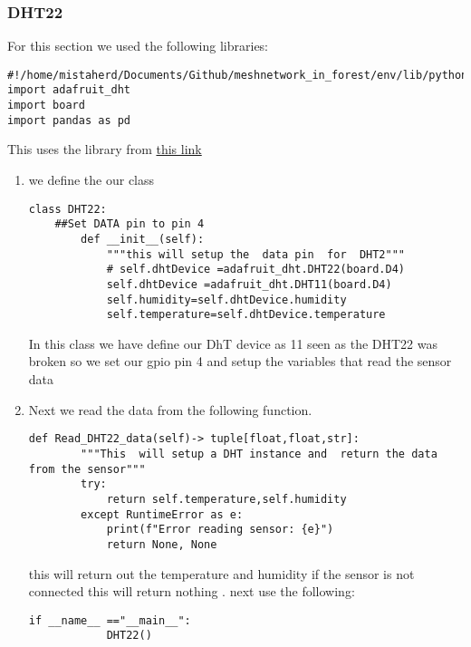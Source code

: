 \subsubsection{DHT22}
For this section we used the following libraries:
\begin{lstlisting}[style=mystyle]
#!/home/mistaherd/Documents/Github/meshnetwork_in_forest/env/lib/python3.11
import adafruit_dht 
import board
import pandas as pd  
\end{lstlisting} 
This uses the library from \href{https://github.com/mrmcwethy/Adafruit_CircuitPython_DHT}{this link}
\begin{enumerate}
    \item we define the our class
    \begin{lstlisting}[style=mystyle]
    class DHT22:
    ##Set DATA pin to pin 4
        def __init__(self):
            """this will setup the  data pin  for  DHT2"""
            # self.dhtDevice =adafruit_dht.DHT22(board.D4)
            self.dhtDevice =adafruit_dht.DHT11(board.D4)
            self.humidity=self.dhtDevice.humidity
            self.temperature=self.dhtDevice.temperature
    \end{lstlisting}
    In this class we have  define our DhT device as 11 seen as the DHT22 was  broken
    so we set  our gpio pin 4 and setup the variables that read the  sensor data
    \item Next we read the data from the following function.
    \begin{lstlisting}[style=mystyle]
        def Read_DHT22_data(self)-> tuple[float,float,str]:
        """This  will setup a DHT instance and  return the data from the sensor"""
        try:
            return self.temperature,self.humidity
        except RuntimeError as e:
            print(f"Error reading sensor: {e}")
            return None, None
    \end{lstlisting}
    this will  return out the  temperature and humidity if the sensor is not connected
    this  will return nothing . next  use the following: 
    \begin{lstlisting}[style=mystyle]
        if __name__ =="__main__":
            DHT22()
    \end{lstlisting}
\end{enumerate}
